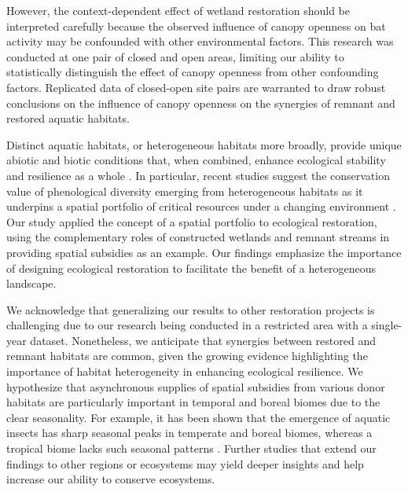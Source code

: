 \documentclass[11pt, class=article, crop=false]{standalone}
\begin{document}
However, the context-dependent effect of wetland restoration should be interpreted carefully because the observed influence of canopy openness on bat activity may be confounded with other environmental factors.
This research was conducted at one pair of closed and open areas, limiting our ability to statistically distinguish the effect of canopy openness from other confounding factors.
Replicated data of closed-open site pairs are warranted to draw robust conclusions on the influence of canopy openness on the synergies of remnant and restored aquatic habitats. 

Distinct aquatic habitats, or heterogeneous habitats more broadly, provide unique abiotic and biotic conditions that, when combined, enhance ecological stability and resilience as a whole \citep{schindler_population_2010, terui_metapopulation_2018, thorson_spatial_2018, terui_emergent_2021, pomeranz_ecosystem_2023}.
In particular, recent studies suggest the conservation value of phenological diversity emerging from heterogeneous habitats as it underpins a spatial portfolio of critical resources under a changing environment \citep{anderson_portfolio_2015, armstrong_watershed_2020}.
Our study applied the concept of a spatial portfolio to ecological restoration, using the complementary roles of constructed wetlands and remnant streams in providing spatial subsidies as an example.
Our findings emphasize the importance of designing ecological restoration to facilitate the benefit of a heterogeneous landscape.

We acknowledge that generalizing our results to other restoration projects is challenging due to our research being conducted in a restricted area with a single-year dataset.
Nonetheless, we anticipate that synergies between restored and remnant habitats are common, given the growing evidence highlighting the importance of habitat heterogeneity in enhancing ecological resilience.
We hypothesize that asynchronous supplies of spatial subsidies from various donor habitats are particularly important in temporal and boreal biomes due to the clear seasonality.
For example, it has been shown that the emergence of aquatic insects has sharp seasonal peaks in temperate and boreal biomes, whereas a tropical biome lacks such seasonal patterns \citep{nash_latitudinal_2023}. 
Further studies that extend our findings to other regions or ecosystems may yield deeper insights and help increase our ability to conserve ecosystems.

\end{document}
